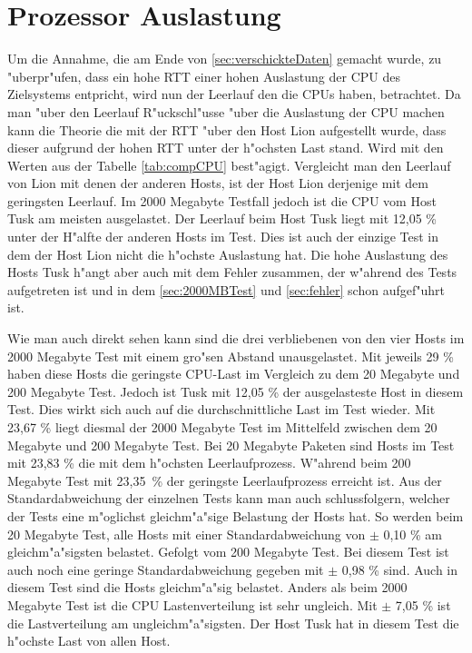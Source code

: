 \section{Prozessor Auslastung}
\label{sec:cpulast}
Um die Annahme, die am Ende von \cref{sec:verschickteDaten} gemacht wurde, zu "uberpr"ufen, dass %
ein hohe RTT einer hohen Auslastung der CPU des Zielsystems entpricht, wird nun der Leerlauf den %
die CPUs haben, betrachtet. Da man "uber den Leerlauf R"uckschl"usse "uber die Auslastung der CPU machen kann %
die Theorie die mit der RTT "uber den Host Lion aufgestellt wurde, dass dieser aufgrund der hohen RTT %
unter der h"ochsten Last stand. Wird mit den Werten aus der Tabelle \cref{tab:compCPU} best"agigt. %
Vergleicht man den Leerlauf von Lion mit denen der anderen Hosts, ist der Host Lion derjenige mit %
dem geringsten Leerlauf. Im 2000 Megabyte Testfall jedoch ist die CPU vom Host Tusk am meisten %
ausgelastet. Der Leerlauf beim Host Tusk liegt mit 12,05 \% unter der H"alfte der anderen Hosts im Test. %
Dies ist auch der einzige Test in dem der Host Lion nicht die h"ochste Auslastung hat. Die hohe Auslastung %
des Hosts Tusk h"angt aber auch mit dem Fehler zusammen, der w"ahrend des Tests aufgetreten ist und in dem %
\cref{sec:2000MBTest} und \cref{sec:fehler} schon aufgef"uhrt ist. %

Wie man auch direkt sehen kann sind die drei verbliebenen von den vier Hosts im 2000 Megabyte Test mit einem gro"sen Abstand %
unausgelastet. Mit jeweils 29 \% haben diese Hosts die geringste CPU-Last im Vergleich zu dem 20 Megabyte und %
200 Megabyte Test. Jedoch ist Tusk mit 12,05 \% der ausgelasteste Host in diesem Test. Dies wirkt sich auch auf die %
durchschnittliche Last im Test wieder. Mit 23,67 \% liegt diesmal der 2000 Megabyte Test im Mittelfeld zwischen %
dem 20 Megabyte und 200 Megabyte Test. Bei 20 Megabyte Paketen sind Hosts im Test mit 23,83 \% die mit dem %
h"ochsten Leerlaufprozess. W"ahrend beim 200 Megabyte Test mit \mbox{23,35 \%} der geringste Leerlaufprozess erreicht %
ist. Aus der Standardabweichung der einzelnen Tests kann man auch schlussfolgern, welcher der Tests eine m"oglichst %
gleichm"a"sige Belastung der Hosts hat. So werden beim 20 Megabyte Test, alle Hosts mit einer Standardabweichung %
von $\pm$ 0,10 \% am gleichm"a"sigsten belastet. Gefolgt vom 200 Megabyte Test. Bei diesem Test ist auch noch eine %
geringe Standardabweichung gegeben mit $\pm$ 0,98 \% sind. Auch in diesem Test sind die Hosts gleichm"a"sig belastet. %
Anders als beim 2000 Megabyte Test ist die CPU Lastenverteilung ist sehr ungleich. Mit $\pm$ 7,05 \% ist die Lastverteilung %
am ungleichm"a"sigsten. Der Host Tusk hat in diesem Test die h"ochste Last von allen Host. %


